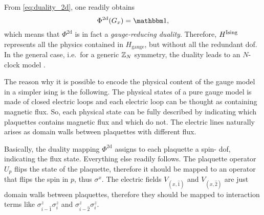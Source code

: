 From \eqref{eq:duality_2d}, one readily obtains
\begin{equation*}
    \Phi^{\text{2d}}(G_x) = \identity,
\end{equation*}
which means that $\Phi^{\text{2d}}$ is in fact a \emph{gauge-reducing duality}.
Therefore, $H^{\text{Ising}}$ represents all the physics contained in $H_{\text{gauge}}$, but without all the redundant \ac{dof}.
In the general case, i.e.~for a generic $\mathbb{Z}_N$ symmetry, the duality leads to an $N$-clock model \cite{radicevic2019spin}.

The reason why it is possible to encode the physical content of the gauge model in a simpler \ac{ising} is the following.
The physical states of a pure gauge model is made of closed electric loops and each electric loop can be thought as containing magnetic flux.
So, each physical state can be fully described by indicating which plaquettes contains magnetic flux and which do not.
The electric lines naturally arises as domain walls between plaquettes with different flux.

Basically, the duality mapping $\Phi^{\text{2d}}$ assigns to each plaquette a spin-\onehalf{} \ac{dof}, indicating the flux state.
Everything else readily follows.
The plaquette operator $U_p$ flips the state of the plaquette, therefore it should be mapped to an operator that flips the spin in $p$, thus $\sigma^x$.
The electric fields $V_{(x, \hat{1})}$ and $V_{(x, \hat{2})}$ are just domain walls between plaquettes, therefore they should be mapped to interaction terms like $\sigma^z_{i-\hat{1}} \sigma^z_{i}$ and $\sigma^z_{i-\hat{2}} \sigma^z_i$.



